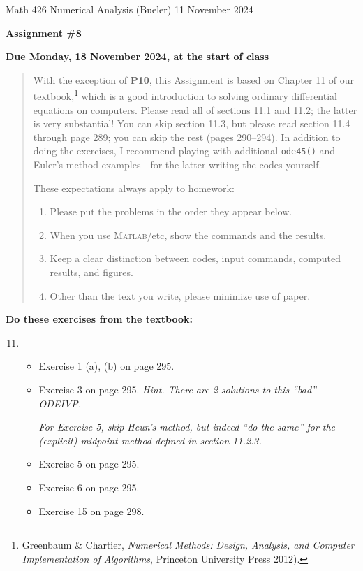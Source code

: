 \documentclass[12pt]{amsart}
\newcommand{\Matlab}{\textsc{Matlab}\xspace}
\begin{document}
\scriptsize \noindent Math 426 Numerical Analysis (Bueler) \hfill 11 November 2024
\normalsize

\medskip\bigskip

\Large\centerline{\textbf{Assignment \#8}}
\large
\bigskip

\centerline{\textbf{Due Monday, 18 November 2024, at the start of class}}
\medskip
\normalsize

\thispagestyle{empty}

\begin{quote}
{\small
With the exception of \textbf{P10}, this Assignment is based on Chapter 11 of our textbook,\footnote{Greenbaum \& Chartier, \emph{Numerical Methods: Design, Analysis, and Computer Implementation of Algorithms}, Princeton University Press 2012).} which is a good introduction to solving ordinary differential equations on computers.  Please read all of sections 11.1 and 11.2; the latter is very substantial!  You can skip section 11.3, but please read section 11.4 through page 289; you can skip the rest (pages 290--294).  In addition to doing the exercises, I recommend playing with additional \texttt{ode45()} and Euler's method examples---for the latter writing the codes yourself.

\medskip
\noindent These expectations always apply to homework:
\renewcommand{\labelenumi}{\arabic{enumi}.\,}
\begin{enumerate}
\item Please put the problems in the order they appear below.
\item When you use \Matlab/etc, show the commands and the results.
\item Keep a clear distinction between codes, input commands, computed results, and figures.
\item Other than the text you write, please minimize use of paper.
\end{enumerate}
}
\end{quote}

\bigskip
\noindent \textbf{Do these exercises from the textbook:}

\smallskip
\renewcommand{\labelenumi}{{\footnotesize\underline{\textsc{Chapter \arabic{enumi}}}}}
\begin{enumerate}
\setcounter{enumi}{10}
\item ~
    \begin{itemize}
    \item Exercise 1 (a), (b) on page 295.
    \item Exercise 3 on page 295. \quad \emph{Hint.  There are 2 solutions to this ``bad'' ODEIVP.}

    \bigskip
    \emph{For Exercise 5, skip Heun's method, but indeed ``do the same'' for the (explicit) midpoint method defined in section 11.2.3.}

    \medskip
    \item Exercise 5 on page 295.

    \bigskip
    \item Exercise 6 on page 295.
    \item Exercise 15 on page 298.
    \end{itemize}
\end{enumerate}
\end{document}
